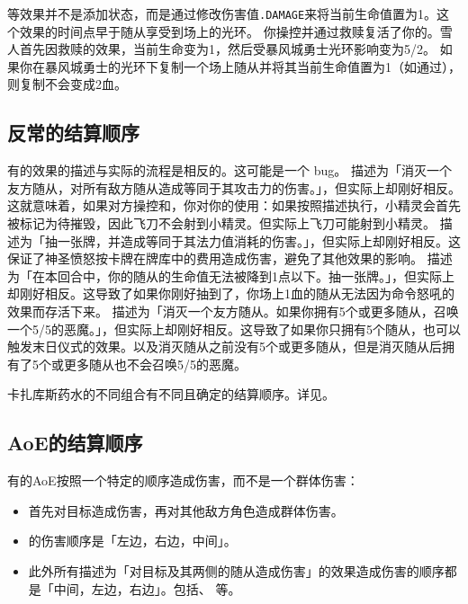 \notice {}等效果并不是添加状态，而是通过修改伤害值\texttt{.DAMAGE}来将当前生命值置为1。这个效果的时间点早于随从享受到场上的光环。
\example 你操控并通过救赎复活了你的。雪人首先因救赎的效果，当前生命变为1，然后受暴风城勇士光环影响变为5/2。
\notice 如果你在暴风城勇士的光环下复制一个场上随从并将其当前生命值置为1（如通过），则复制不会变成2血。

\subsection{反常的结算顺序}

有的效果的描述与实际的流程是相反的。这可能是一个 bug。
\example {}描述为「消灭一个友方随从，对所有敌方随从造成等同于其攻击力的伤害。」，但实际上却刚好相反。这就意味着，如果对方操控和，你对你的使用：如果按照描述执行，小精灵会首先被标记为待摧毁，因此飞刀不会射到小精灵。但实际上飞刀可能射到小精灵。
\example {}描述为「抽一张牌，并造成等同于其法力值消耗的伤害。」，但实际上却刚好相反。这保证了神圣愤怒按卡牌在牌库中的费用造成伤害，避免了其他效果的影响。
\example {}描述为「在本回合中，你的随从的生命值无法被降到1点以下。抽一张牌。」，但实际上却刚好相反。这导致了如果你刚好抽到了，你场上1血的随从无法因为命令怒吼的效果而存活下来。
\example {}描述为「消灭一个友方随从。如果你拥有5个或更多随从，召唤一个5/5的恶魔。」，但实际上却刚好相反。这导致了如果你只拥有5个随从，也可以触发末日仪式的效果。以及消灭随从之前没有5个或更多随从，但是消灭随从后拥有了5个或更多随从也不会召唤5/5的恶魔。

卡扎库斯药水的不同组合有不同且确定的结算顺序。详见。

\subsection{AoE的结算顺序}

有的AoE按照一个特定的顺序造成伤害，而不是一个群体伤害：
\begin{itemize}
    \item {}首先对目标造成伤害，再对其他敌方角色造成群体伤害。
    \item {}的伤害顺序是「左边，右边，中间」。
    \item 此外所有描述为「对目标及其两侧的随从造成伤害」的效果造成伤害的顺序都是「中间，左边，右边」。包括、 等。
\end{itemize}

